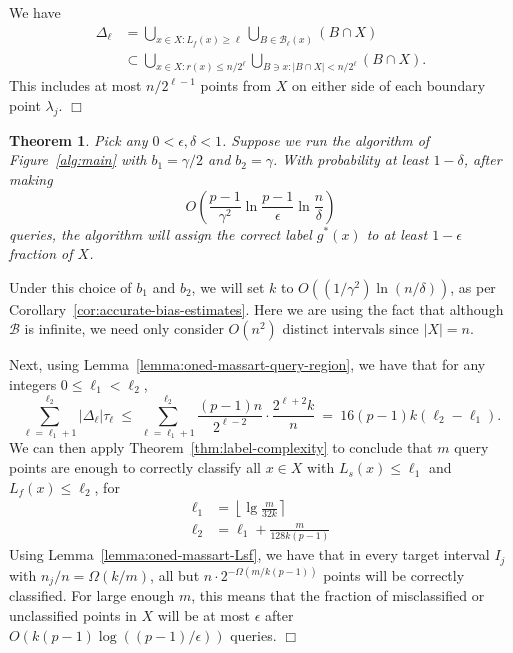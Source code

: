 \documentclass{article}
\def\B{{\mathcal B}}
\newtheorem{thm}{Theorem}
\newenvironment{proof}{\noindent {\sc Proof:}}{$\Box$ \medskip}
\begin{document}
\begin{proof}
We have
\begin{align*}
\Delta_\ell 
&= \bigcup_{x \in X: L_f(x) \geq \ell} \bigcup_{B \in \B_{\ell}(x)} (B \cap X) \\
&\subset \bigcup_{x \in X: r(x) \leq n/2^\ell} \bigcup_{B \ni x: |B \cap X| < n/2^\ell} (B \cap X) 
.
\end{align*}
This includes at most $n/2^{\ell-1}$ points from $X$ on either side of each boundary point $\lambda_j$.
\end{proof}

\begin{thm}
Pick any $0 < \epsilon, \delta < 1$. Suppose we run the algorithm of Figure~\ref{alg:main} with $b_1 = \gamma/2$ and $b_2 = \gamma$. With probability at least $1-\delta$, after making
$$ O \left( \frac{p-1}{\gamma^2} \ln \frac{p-1}{\epsilon} \ln \frac{n}{\delta} \right) $$
queries, the algorithm will assign the correct label $g^*(x)$ to at least $1-\epsilon$ fraction of $X$.
\label{thm:oned-massart}
\end{thm}
\begin{proof}
Under this choice of $b_1$ and $b_2$, we will set $k$ to $O((1/\gamma^2) \ln (n/\delta))$, as per Corollary~\ref{cor:accurate-bias-estimates}. Here we are using the fact that although $\B$ is infinite, we need only consider $O(n^2)$ distinct intervals since $|X| = n$.

Next, using Lemma~\ref{lemma:oned-massart-query-region}, we have that for any integers $0 \leq \ell_1 < \ell_2$,
$$ \sum_{\ell = \ell_1+1}^{\ell_2} |\Delta_\ell| \tau_\ell
\ \leq \ 
\sum_{\ell = \ell_1+1}^{\ell_2} \frac{(p-1) n}{2^{\ell-2}} \cdot \frac{2^{\ell+2}k}{n}
\ = \ 
16(p-1)k (\ell_2 - \ell_1).
$$
We can then apply Theorem~\ref{thm:label-complexity} to conclude that $m$ query points are enough to correctly classify all $x \in X$ with $L_s(x) \leq \ell_1$ and $L_f(x) \leq \ell_2$, for
\begin{align*}
\ell_1
&= 
\left\lfloor \lg \frac{m}{32k} \right\rceil \\
\ell_2
&=
\ell_1 + \frac{m}{128 k(p-1)}
\end{align*}
Using Lemma~\ref{lemma:oned-massart-Lsf}, we have that in every target interval $I_j$ with $n_j/n = \Omega(k/m)$, all but $n \cdot 2^{-\Omega(m/k(p-1))}$ points will be correctly classified. For large enough $m$, this means that the fraction of misclassified or unclassified points in $X$ will be at most $\epsilon$ after $O(k(p-1) \log ((p-1)/\epsilon))$ queries.
\end{proof}
\end{document}
